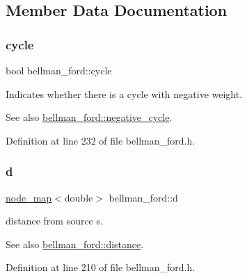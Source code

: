 \subsection{Member Data Documentation}
\mbox{\label{classbellman__ford_aa2168afff14546b2fd99d2b52681156b}} 
\subsubsection{\texorpdfstring{cycle}{cycle}}
{\footnotesize\ttfamily bool bellman\+\_\+ford\+::cycle\hspace{0.3cm}{\ttfamily [private]}}



Indicates whether there is a cycle with negative weight. 

\begin{DoxySeeAlso}{See also}
\mbox{\hyperlink{classbellman__ford_af9cd8be38bb1504089997581d9aa4f64}{bellman\+\_\+ford\+::negative\+\_\+cycle}}. 
\end{DoxySeeAlso}


Definition at line 232 of file bellman\+\_\+ford.\+h.

\mbox{\label{classbellman__ford_a0e3b99854a3f998f8ef6cde6fb902040}} 
\subsubsection{\texorpdfstring{d}{d}}
{\footnotesize\ttfamily \mbox{\hyperlink{classnode__map}{node\+\_\+map}}$<$double$>$ bellman\+\_\+ford\+::d\hspace{0.3cm}{\ttfamily [private]}}



distance from source s. 

\begin{DoxySeeAlso}{See also}
\mbox{\hyperlink{classbellman__ford_a881e5b021e69aced997185208438f910}{bellman\+\_\+ford\+::distance}}. 
\end{DoxySeeAlso}


Definition at line 210 of file bellman\+\_\+ford.\+h.

\mbox{\label{classbellman__ford_a5c69a3ac59077a7a7e4b0484e5f85a32}} 
